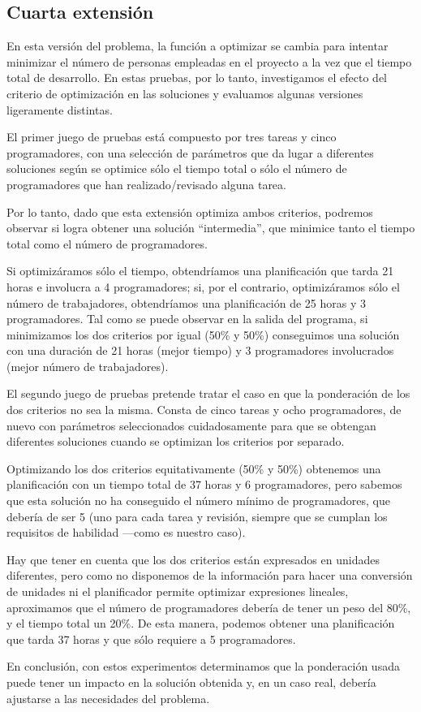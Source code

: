 
\subsection{Cuarta extensión} \label{sec:res-ext4}

En esta versión del problema, la función a optimizar se cambia para intentar 
minimizar el número de personas empleadas en el proyecto a la vez que el 
tiempo total de desarrollo. En estas pruebas, por lo tanto, investigamos el 
efecto del criterio de optimización en las soluciones y evaluamos algunas 
versiones ligeramente distintas.

El primer juego de pruebas está compuesto por tres tareas y cinco 
programadores, con una selección de parámetros que da lugar a diferentes 
soluciones según se optimice sólo el tiempo total o sólo el número de 
programadores que han realizado/revisado alguna tarea. 

Por lo tanto, dado que esta extensión optimiza ambos criterios, podremos 
observar si logra obtener una solución ``intermedia'', que minimice tanto el 
tiempo total como el número de programadores.

Si optimizáramos sólo el tiempo, obtendríamos una planificación que tarda 21 
horas e involucra a 4 programadores; si, por el contrario, optimizáramos sólo 
el número de trabajadores, obtendríamos una planificación de 25 horas y 3 
programadores. Tal como se puede observar en la salida del programa, si 
minimizamos los dos criterios por igual (50\% y 50\%) conseguimos una solución 
con una duración de 21 horas (mejor tiempo) y 3 programadores involucrados 
(mejor número de trabajadores).



El segundo juego de pruebas pretende tratar el caso en que la ponderación de 
los dos criterios no sea la misma. Consta de cinco tareas y ocho 
programadores, de nuevo con parámetros seleccionados cuidadosamente para que se
obtengan diferentes soluciones cuando se optimizan los criterios por separado.

Optimizando los dos criterios equitativamente (50\% y 50\%) obtenemos una 
planificación con un tiempo total de 37 horas y 6 programadores, pero sabemos 
que esta solución no ha conseguido el número mínimo de programadores, que 
debería de ser 5 (uno para cada tarea y revisión, siempre que se cumplan los 
requisitos de habilidad ---como es nuestro caso).

Hay que tener en cuenta que los dos criterios están expresados en unidades 
diferentes, pero como no disponemos de la información para hacer una 
conversión de unidades ni el planificador permite optimizar expresiones 
lineales, aproximamos que el número de programadores debería de tener un peso 
del 80\%, y el tiempo total un 20\%. De esta manera, podemos obtener una 
planificación que tarda 37 horas y que sólo requiere a 5 programadores.

En conclusión, con estos experimentos determinamos que la ponderación usada 
puede tener un impacto en la solución obtenida y, en un caso real, debería 
ajustarse a las necesidades del problema.


